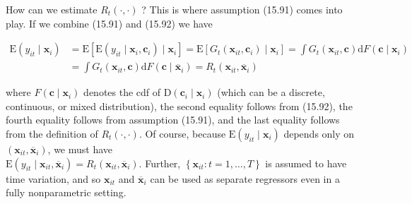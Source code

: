 \documentclass[10pt]{article}
\begin{document}
How can we estimate $R_{t}(\cdot, \cdot)$ ? This is where assumption (15.91) comes into play. If we combine (15.91) and (15.92) we have

$$
\begin{aligned}
\mathrm{E}\left(y_{i t} \mid \mathbf{x}_{i}\right) & =\mathrm{E}\left[\mathrm{E}\left(y_{i t} \mid \mathbf{x}_{i}, \mathbf{c}_{i}\right) \mid \mathbf{x}_{i}\right]=\mathrm{E}\left[G_{t}\left(\mathbf{x}_{i t}, \mathbf{c}_{i}\right) \mid \mathbf{x}_{i}\right]=\int G_{t}\left(\mathbf{x}_{i t}, \mathbf{c}\right) \mathrm{d} F\left(\mathbf{c} \mid \mathbf{x}_{i}\right) \\
& =\int G_{t}\left(\mathbf{x}_{i t}, \mathbf{c}\right) \mathrm{d} F\left(\mathbf{c} \mid \overline{\mathbf{x}}_{i}\right)=R_{t}\left(\mathbf{x}_{i t}, \overline{\mathbf{x}}_{i}\right)
\end{aligned}
$$

where $F\left(\mathbf{c} \mid \mathbf{x}_{i}\right)$ denotes the cdf of $\mathrm{D}\left(\mathbf{c}_{i} \mid \mathbf{x}_{i}\right)$ (which can be a discrete, continuous, or mixed distribution), the second equality follows from (15.92), the fourth equality follows from assumption (15.91), and the last equality follows from the definition of $R_{t}(\cdot, \cdot)$. Of course, because $\mathrm{E}\left(y_{i t} \mid \mathbf{x}_{i}\right)$ depends only on $\left(\mathbf{x}_{i t}, \overline{\mathbf{x}}_{i}\right)$, we must have\\
$\mathrm{E}\left(y_{i t} \mid \mathbf{x}_{i t}, \overline{\mathbf{x}}_{i}\right)=R_{t}\left(\mathbf{x}_{i t}, \overline{\mathbf{x}}_{i}\right)$. Further, $\left\{\mathbf{x}_{i t}: t=1, \ldots, T\right\}$ is assumed to have time variation, and so $\mathbf{x}_{i t}$ and $\overline{\mathbf{x}}_{i}$ can be used as separate regressors even in a fully nonparametric setting.
\end{document}
